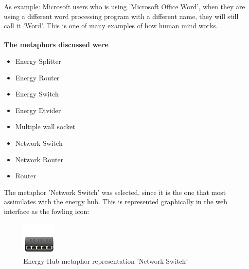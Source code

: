As example: Microsoft users who is using 'Microsoft Office Word', when they are using a different word processing program with a different name, they will still call it 'Word'. This is one of many examples of how human mind works.\\\\
\textbf{The metaphors discussed were}
\begin{itemize}
	\item Energy Splitter
	\item Energy Router
	\item Energy Switch
	\item Energy Divider
	\item Multiple wall socket
	\item Network Switch
	\item Network Router
	\item Router
\end{itemize}

The metaphor 'Network Switch' was selected, since it is the one that most assimilates with the energy hub. This is represented graphically in the web interface as the fowling icon:

\begin{figure}[H]
	\center
	\includegraphics[width=0.15\textwidth]{images/dock_hub.png}
   	\caption{Energy Hub metaphor representation 'Network Switch'}
\end{figure}







